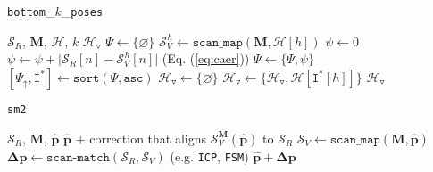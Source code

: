 \begin{algorithm}[]
  \caption{\texttt{bottom}\_$k$\_\texttt{poses}}
  \begin{spacing}{1.0}
  \begin{algorithmic}[1]
    \REQUIRE $\mathcal{S}_R$, $\bm{M}$, $\mathcal{H}$, $k$
    \ENSURE $\mathcal{H}_{\triangledown}$
    \STATE $\Psi \leftarrow \{\varnothing \}$
      \STATE $\mathcal{S}_V^{\hspace{1pt} h} \leftarrow \texttt{scan\_map}(\bm{M}, \mathcal{H}[h])$
      \STATE $\psi \leftarrow 0$
        \STATE $\psi \leftarrow \psi + \big|\mathcal{S}_R[n]-\mathcal{S}_V^{\hspace{1pt} h}[n]\big|$ \hfill {\small (Eq. (\ref{eq:caer})})
      \ENDFOR
      \STATE $\Psi \leftarrow \{\Psi, \psi\}$
    \ENDFOR
    \STATE $[\Psi_{\uparrow}, \texttt{I}^{\ast}] \leftarrow \texttt{sort}(\Psi, \texttt{asc})$
    \STATE $\mathcal{H}_{\triangledown} \leftarrow \{\varnothing \}$
      \STATE $\mathcal{H}_{\triangledown} \leftarrow \{\mathcal{H}_{\triangledown}, \mathcal{H}[\texttt{I}^{\ast}[h]]\}$
    \ENDFOR
    \RETURN $\mathcal{H}_{\triangledown}$
  \end{algorithmic}
  \end{spacing}
  \label{alg:bottom_k}
\end{algorithm}

\begin{algorithm}[]
  \caption{\texttt{sm2}}
  \begin{spacing}{1.0}
  \begin{algorithmic}[1]
    \REQUIRE $\mathcal{S}_R$, $\bm{M}$, $\hat{\bm{p}}$
    \ENSURE $\hat{\bm{p}}$ $+$ correction that aligns $\mathcal{S}_V^{\bm{M}}(\hat{\bm{p}})$ to $\mathcal{S}_R$
    \STATE $\mathcal{S}_V \leftarrow \texttt{scan\_map}(\bm{M}, \hat{\bm{p}})$
    \STATE $\bm{\Delta p} \leftarrow \texttt{scan-match}(\mathcal{S}_R,\mathcal{S}_V)$ \hfill {\small (e.g. \texttt{ICP}\cite{Vizzo2023}, \texttt{FSM}\cite{Filotheou2022f}})
    \RETURN $\hat{\bm{p}} + \bm{\Delta p}$
  \end{algorithmic}
  \end{spacing}
  \label{alg:sm2}
\end{algorithm}
